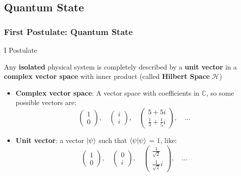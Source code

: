 \documentclass{beamer}
\newcommand{\calH}{\mathcal{H}}
\newcommand{\kp}{\ket{\psi}}
\newcommand{\oost}{\frac{1}{\sqrt{2}}}
\begin{document}
\subsection{Quantum State}	
\begin{frame}%
	\frametitle{First Postulate: Quantum State}
\begin{block}{I Postulate}
	
Any \textbf{isolated} physical system	is completely described by a \textbf{unit vector} in a \textbf{complex vector space} with inner product (called \textbf{Hilbert Space} $\calH$)	
	\end{block}
		\begin{itemize}
		\pause
		\item \textbf{Complex vector space}: A vector space with coefficients in $\mathbb{C}$, so some possible vectors are: 
		\[
		\begin{pmatrix}
		1\\
		0
		\end{pmatrix},\quad
		\begin{pmatrix}
		i\\
		i
		\end{pmatrix},\quad
		\begin{pmatrix}
		5+5i\\
		\frac{1}{3} + \frac{1}{5}i
		\end{pmatrix},\quad\ldots
		\]
		\pause
		\item \textbf{Unit vector}: a vector $\kp$ such that $\braket{\psi | \psi}$ = 1, like: 
		\[
		\begin{pmatrix}
		1\\
		0
		\end{pmatrix},\quad
		\begin{pmatrix}
		0\\
		i
		\end{pmatrix},\quad
		\begin{pmatrix}
		\frac{1}{\sqrt{2}}\\
		\oost i
		\end{pmatrix},\quad\ldots
		\]
		\end{itemize}
	\end{frame}
\end{document}
